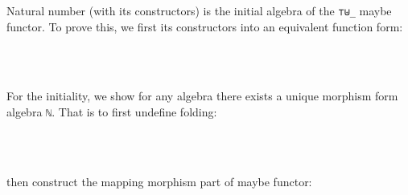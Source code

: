 Natural number (with its constructors) is the initial algebra of the \texttt{⊤⊎\_} maybe functor. To prove this, we first its constructors into an equivalent function form:

\begin{code}%
\>[0]\AgdaFunction{[z,s]}\AgdaSpace{}%
\AgdaSymbol{:}\AgdaSpace{}%
\AgdaSpace{}%
\AgdaSpace{}%
\AgdaSpace{}%
\AgdaSpace{}%
\<%
\\
\>[0]\AgdaFunction{[z,s]}\AgdaSpace{}%
\AgdaSymbol{(}\AgdaSpace{}%
\AgdaSymbol{)}\AgdaSpace{}%
\AgdaSymbol{=}\AgdaSpace{}%
\<%
\\
\>[0]\AgdaFunction{[z,s]}\AgdaSpace{}%
\AgdaSymbol{(}\AgdaSpace{}%
\AgdaSymbol{)}\AgdaSpace{}%
\AgdaSymbol{=}\AgdaSpace{}%
\AgdaSpace{}%
\<%
\end{code}

For the initiality, we show for any algebra there exists a unique morphism form algebra \texttt{ℕ}. That is to first undefine folding:

\begin{code}%
\>[0]\AgdaSpace{}%
\AgdaSymbol{:}\AgdaSpace{}%
\AgdaSymbol{(}\AgdaSpace{}%
\AgdaSpace{}%
\AgdaSpace{}%
\AgdaSpace{}%
\AgdaSymbol{)}\AgdaSpace{}%
\AgdaSpace{}%
\AgdaSpace{}%
\AgdaSpace{}%
\<%
\\
\>[0]\AgdaSpace{}%
\AgdaSpace{}%
\AgdaSpace{}%
\AgdaSymbol{=}\AgdaSpace{}%
\AgdaSpace{}%
\AgdaSymbol{(}\AgdaSpace{}%
\AgdaSymbol{)}\<%
\\
\>[0]\AgdaSpace{}%
\AgdaSpace{}%
\AgdaSymbol{(}\AgdaSpace{}%
\AgdaSymbol{)}\AgdaSpace{}%
\AgdaSymbol{=}\AgdaSpace{}%
\AgdaSpace{}%
\AgdaSymbol{(}\AgdaSpace{}%
\AgdaSymbol{(}\AgdaSpace{}%
\AgdaSpace{}%
\AgdaSymbol{))}\<%
\end{code}

then construct the mapping morphism part of maybe functor:

